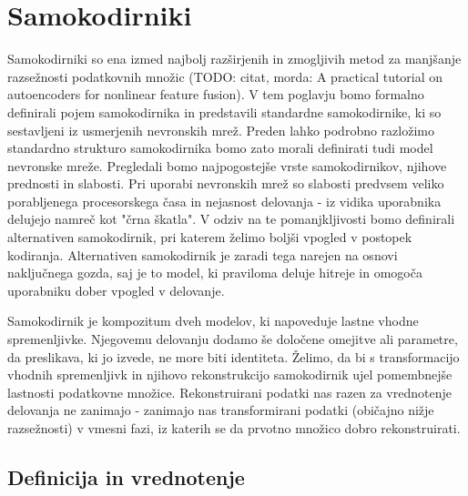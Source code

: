 \documentclass[12pt,a4paper]{article}
\begin{document}


\section{Samokodirniki}

Samokodirniki so ena izmed najbolj razširjenih in zmogljivih metod za manjšanje razsežnosti podatkovnih množic (TODO: citat, morda: A practical tutorial on autoencoders for nonlinear feature fusion). 
V tem poglavju bomo formalno definirali pojem samokodirnika in predstavili standardne samokodirnike, ki so sestavljeni iz usmerjenih nevronskih mrež. 
Preden lahko podrobno razložimo standardno strukturo samokodirnika bomo zato morali definirati tudi model nevronske mreže. 
Pregledali bomo najpogostejše vrste samokodirnikov, njihove prednosti in slabosti. 
Pri uporabi nevronskih mrež so slabosti predvsem veliko porabljenega procesorskega časa in nejasnost delovanja - iz vidika uporabnika delujejo namreč kot "črna škatla". 
V odziv na te pomanjkljivosti bomo definirali alternativen samokodirnik, pri katerem želimo boljši vpogled v postopek kodiranja. 
Alternativen samokodirnik je zaradi tega narejen na osnovi naključnega gozda, saj je to model, ki praviloma deluje hitreje in omogoča uporabniku dober vpogled v delovanje.

Samokodirnik je kompozitum dveh modelov, ki napoveduje lastne vhodne spremenljivke. 
Njegovemu delovanju dodamo še določene omejitve ali parametre, da preslikava, ki jo izvede, ne more biti identiteta. 
Želimo, da bi s transformacijo vhodnih spremenljivk in njihovo rekonstrukcijo samokodirnik ujel pomembnejše lastnosti podatkovne množice. 
Rekonstruirani podatki nas razen za vrednotenje delovanja ne zanimajo - zanimajo nas transformirani podatki (običajno nižje razsežnosti) v vmesni fazi, iz katerih se da prvotno množico dobro rekonstruirati.



\subsection{Definicija in vrednotenje}
\end{document}
